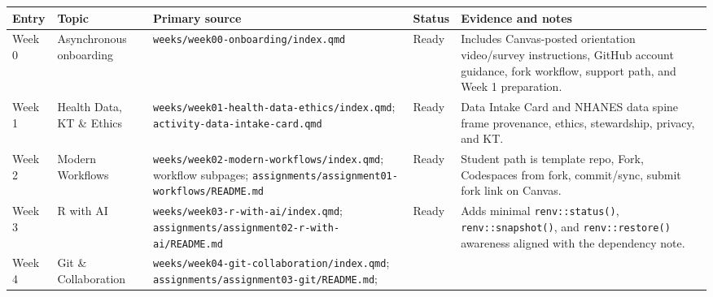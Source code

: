 \documentclass[
  letterpaper,
  DIV=11,
  numbers=noendperiod,
  oneside]{scrreprt}
\begin{document}
\begin{longtable}[]{@{}
  >{\raggedright\arraybackslash}p{}
  >{\raggedright\arraybackslash}p{}
  >{\raggedright\arraybackslash}p{}
  >{\raggedright\arraybackslash}p{}
  >{\raggedright\arraybackslash}p{}@{}}
\toprule\noalign{}
\begin{minipage}[b]{\linewidth}\raggedright
Entry
\end{minipage} & \begin{minipage}[b]{\linewidth}\raggedright
Topic
\end{minipage} & \begin{minipage}[b]{\linewidth}\raggedright
Primary source
\end{minipage} & \begin{minipage}[b]{\linewidth}\raggedright
Status
\end{minipage} & \begin{minipage}[b]{\linewidth}\raggedright
Evidence and notes
\end{minipage} \\
\midrule\noalign{}
\endhead
\bottomrule\noalign{}
\endlastfoot
Week 0 & Asynchronous onboarding &
\texttt{weeks/week00-onboarding/index.qmd} & Ready & Includes
Canvas-posted orientation video/survey instructions, GitHub account
guidance, fork workflow, support path, and Week 1 preparation. \\
Week 1 & Health Data, KT \& Ethics &
\texttt{weeks/week01-health-data-ethics/index.qmd};
\texttt{activity-data-intake-card.qmd} & Ready & Data Intake Card and
NHANES data spine frame provenance, ethics, stewardship, privacy, and
KT. \\
Week 2 & Modern Workflows &
\texttt{weeks/week02-modern-workflows/index.qmd}; workflow subpages;
\texttt{assignments/assignment01-workflows/README.md} & Ready & Student
path is template repo, Fork, Codespaces from fork, commit/sync, submit
fork link on Canvas. \\
Week 3 & R with AI & \texttt{weeks/week03-r-with-ai/index.qmd};
\texttt{assignments/assignment02-r-with-ai/README.md} & Ready & Adds
minimal \texttt{renv::status()}, \texttt{renv::snapshot()}, and
\texttt{renv::restore()} awareness aligned with the dependency note. \\
Week 4 & Git \& Collaboration &
\texttt{weeks/week04-git-collaboration/index.qmd};
\texttt{assignments/assignment03-git/README.md};

\end{longtable}
\end{document}
